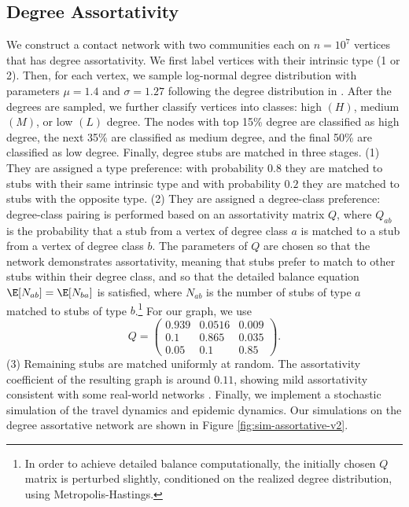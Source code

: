 \documentclass[11pt]{article}
\begin{document}
\subsection{Degree Assortativity}
\label{sec:deg-assort}
We construct a contact network with two communities each on $n = 10^7$ vertices that has degree assortativity. We first label vertices with their intrinsic type (1 or 2). Then, for each vertex, we sample log-normal degree distribution with parameters $\mu = 1.4$ and $\sigma = 1.27$ following the degree distribution in \cite{hill2021network}. After the degrees are sampled, we further classify vertices into classes: high $(H)$, medium $(M)$, or low $(L)$ degree. The nodes with top 15\% degree are classified as high degree, the next 35\% are classified as medium degree, and the final 50\% are classified as low degree. Finally, degree stubs are matched in three stages. (1) They are assigned a type preference: with probability $0.8$ they are matched to stubs with their same intrinsic type and with probability $0.2$ they are matched to stubs with the opposite type. (2) They are assigned a degree-class preference: degree-class pairing is performed based on an assortativity matrix $Q$, where $Q_{ab}$ is the probability that a stub from a vertex of degree class $a$ is matched to a stub from a vertex of degree class $b$. The parameters of $Q$ are chosen so that the network demonstrates assortativity, meaning that stubs prefer to match to other stubs within their degree class, and so that the detailed balance equation $\E[N_{ab}] = \E[N_{ba}]$ is satisfied, where $N_{ab}$ is the number of stubs of type $a$ matched to stubs of type $b$.\footnote{In order to achieve detailed balance computationally, the initially chosen $Q$ matrix is perturbed slightly, conditioned on the realized degree distribution, using Metropolis-Hastings.} For our graph, we use
\[
    Q = \begin{pmatrix}
    0.939 &  0.0516 & 0.009 \\
    0.1 & 0.865 & 0.035 \\
    0.05 & 0.1 & 0.85
    \end{pmatrix}.
\]
(3) Remaining stubs are matched uniformly at random. The assortativity coefficient of the resulting graph is around $0.11$, showing mild assortativity consistent with some real-world networks \cite{newman2002assortative}. Finally, we implement a stochastic simulation of the travel dynamics and epidemic dynamics. Our simulations on the degree assortative network are shown in Figure \ref{fig:sim-assortative-v2}.
\end{document}
